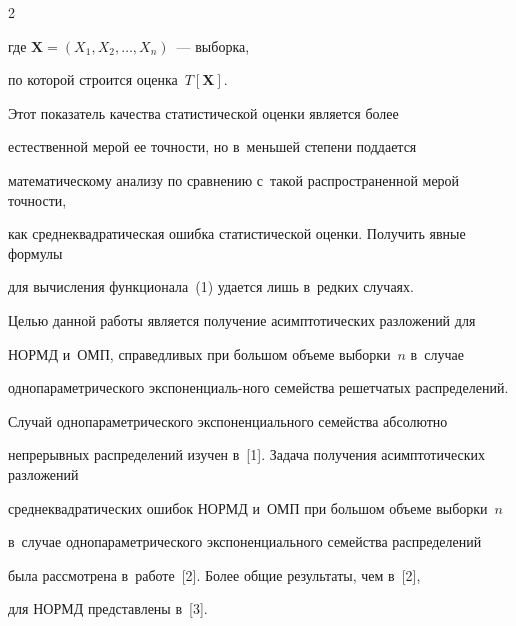 \begin{multicols}{2}
\begin{equation}
  \label{e1-ch}


  \end{equation}


  где $\mathbf{X}=\left(X_1,X_2,\ldots,X_n\right)$~--- выборка, 


  по которой строится оценка~$T[\mathbf{X}]$.


  







  Этот показатель качества статистической оценки является более 


  естественной мерой ее точности, но в~меньшей степени поддается 


  математическому анализу по сравнению с~такой распространенной мерой точности, 


  как среднеквадратическая ошибка статистической оценки. Получить явные формулы 


  для вычисления функционала~(1) удается лишь в~редких случаях.





  Целью данной работы является получение асимптотических разложений для 


  НОРМД и~ОМП, справедливых при большом объеме выборки~$n$ в~случае 


  однопараметрического экспоненциаль-\linebreak ного семейства решетчатых распределений.


  Случай однопараметрического экспоненциального семейства абсолютно 


  непрерывных распределений \mbox{изучен} в~[1]. Задача получения асимптотических разложений


  среднеквадратических ошибок \mbox{НОРМД} и~ОМП при большом объеме выборки~$n$


  в~случае однопараметрического экспоненциального семейства распределений


  была рассмотрена в~работе~[2]. Более общие результаты, чем в~[2],


  для НОРМД представлены в~[3].


  


  \vspace*{-12pt}









\end{multicols}
